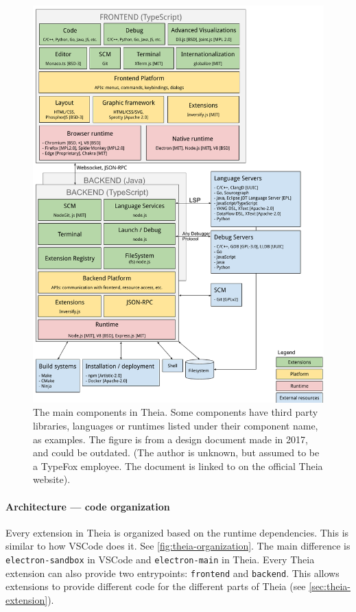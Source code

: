 \begin{figure}[htbp]  %
  \centering
  \includegraphics[width=\textwidth]{figures/Multi-Language-IDE-implemented-in-JS-Scope-and-Architecture}
  \caption[Theia module Architecture]{The main components in Theia. Some components have third party libraries, languages or runtimes listed under their component name, as examples. The figure is from a design document made in 2017, and could be outdated. (The author is unknown, but assumed to be a TypeFox employee. The document is linked to on the official Theia website).~\cite{MultiLanguageIDEImplemented2017}}\label{fig:theia-components}
\end{figure}

\paragraph*{Architecture --- code organization}
Every extension in Theia is organized based on the runtime dependencies.
This is similar to how \gls{VSCode} does it.
See \cref{fig:theia-organization}. The main difference is \texttt{electron-sandbox} in \gls{VSCode} and \texttt{electron-main} in Theia.
Every Theia extension can also provide two entrypoints: \texttt{frontend} and \texttt{backend}. This allows extensions to provide different code for the different parts of Theia (see \cref{sec:theia-extension}).

